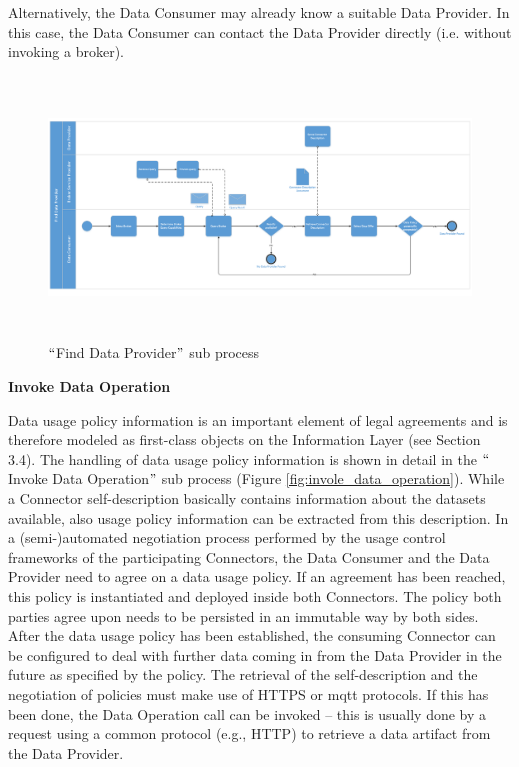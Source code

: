 Alternatively, the Data Consumer may already know a suitable Data Provider. In this case, the Data Consumer can contact the Data Provider directly (i.e. without invoking a broker).




\begin{figure}[H]
	\begin{Center}
		\includegraphics[width=6.53in,height=2.74in]{./media/image27.PNG}
		\caption{ $``$Find Data Provider$"$  sub process}
		\label{fig:_Find_Data_Provider__sub_process}
	\end{Center}
\end{figure}





\textbf{Invoke Data Operation}

Data usage policy information is an important element of legal agreements and is therefore modeled as first-class objects on the Information Layer (see Section 3.4). The handling of data usage policy information is shown in detail in the $``$Invoke Data Operation$"$  sub process (Figure \ref{fig:invole_data_operation}). While a Connector self-description basically contains information about the datasets available, also usage policy information can be extracted from this description. In a (semi-)automated negotiation process performed by the usage control frameworks of the participating Connectors, the Data Consumer and the Data Provider need to agree on a data usage policy. If an agreement has been reached, this policy is instantiated and deployed inside both Connectors. The policy both parties agree upon needs to be persisted in an immutable way by both sides. After the data usage policy has been established, the consuming Connector can be configured to deal with further data coming in from the Data Provider in the future as specified by the policy. The retrieval of the self-description and the negotiation of policies must make use of HTTPS or mqtt protocols. If this has been done, the Data Operation call can be invoked – this is usually done by a request using a common protocol (e.g., HTTP) to retrieve a data artifact from the Data Provider. 

